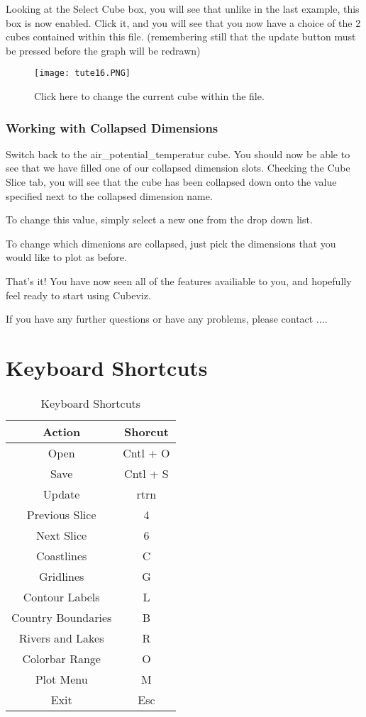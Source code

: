 \documentclass[a4paper,12pt]{article}
\begin{document}
Looking at the Select Cube box, you will see that unlike in the last example,
this box is now enabled. Click it, and you will see that you now have a choice
of the 2 cubes contained within this file.
(remembering still that the update button must be pressed before the graph will
be redrawn)

\begin{figure}[H]
\centering
\texttt{[image: tute16.PNG]}
\caption{Click here to change the current cube within the file.}
\label{overflow}
\end{figure}

\subsubsection{Working with Collapsed Dimensions}

Switch back to the air\_potential\_temperatur cube. You should now be able to
see that we have filled one of our collapsed dimension
slots. Checking the Cube Slice tab, you will see that the cube has been
collapsed down onto the value specified next to the collapsed dimension name.

To change this value, simply select a new one from the drop down list.

To change which dimenions are collapsed, just pick the dimensions that you
would like to plot as before.

\vspace{4mm}

That's it! You have now seen all of the features availiable to you, and
hopefully feel ready to start using Cubeviz.

If you have any further questions or have any problems, please contact $....$

\pagebreak

\section{Keyboard Shortcuts}

\begin{table}[h]
\caption{Keyboard Shortcuts}
\centering
\begin{tabular}{c c}
\hline\hline
Action & Shorcut \\ [0.5ex]
\hline
Open & Cntl + O \\
Save & Cntl + S \\
Update & rtrn \\
Previous Slice & 4 \\
Next Slice & 6 \\
Coastlines & C \\
Gridlines & G \\
Contour Labels & L \\
Country Boundaries & B \\
Rivers and Lakes & R \\
Colorbar Range & O \\
Plot Menu & M \\
Exit & Esc \\ [1ex]
\hline
\end{tabular}
\label{table:shortcuts}
\end{table}
\end{document}
